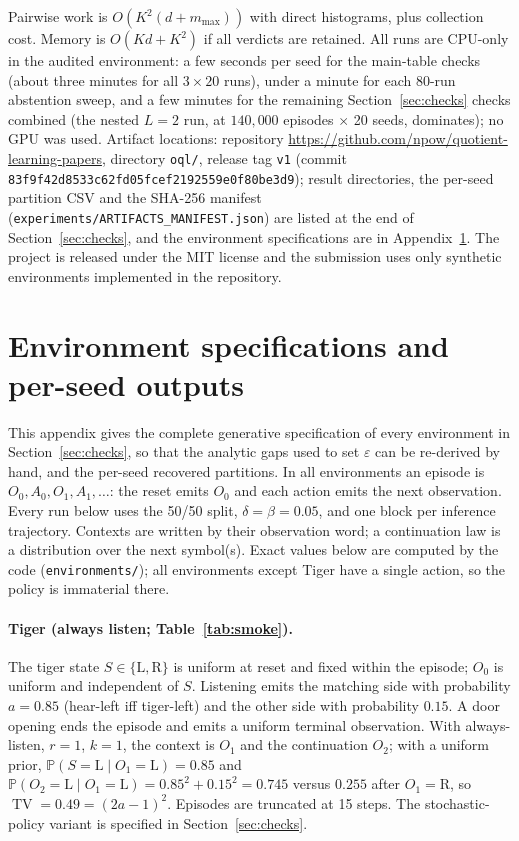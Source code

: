 \documentclass{article}
\newcommand{\Prb}{\mathbb P}
\newcommand{\eps}{\varepsilon}
\DeclareMathOperator{\TV}{TV}
\begin{document}
Pairwise work is $O(K^2(d+m_{\max}))$ with direct histograms, plus collection
cost.  Memory is $O(Kd+K^2)$ if all verdicts are retained.  All runs are
CPU-only in the audited environment: a few seconds per seed for the
main-table checks (about three minutes for all $3\times20$ runs), under
a minute for each 80-run abstention sweep, and a few minutes for the
remaining Section~\ref{sec:checks} checks combined (the nested $L=2$ run,
at $140{,}000$ episodes $\times$ 20 seeds, dominates); no GPU was used.
Artifact locations: repository \url{https://github.com/npow/quotient-learning-papers},
directory \texttt{oql/}, release tag \texttt{v1} (commit \texttt{83f9f42d8533c62fd05fcef2192559e0f80be3d9}); result directories, the
per-seed partition CSV and the SHA-256 manifest
(\texttt{experiments/ARTIFACTS\_MANIFEST.json}) are listed at the end of
Section~\ref{sec:checks}, and the environment specifications are in
Appendix~\ref{app:envs}.  The project is released under the MIT license and the submission uses only
synthetic environments implemented in the repository.

\section{Environment specifications and per-seed outputs}\label{app:envs}

This appendix gives the complete generative specification of every
environment in Section~\ref{sec:checks}, so that the analytic gaps used to set
$\eps$ can be re-derived by hand, and the per-seed recovered partitions.
In all environments an episode is $O_0,A_0,O_1,A_1,\ldots$: the reset emits
$O_0$ and each action emits the next observation.  Every run below uses the
50/50 split, $\delta=\beta=0.05$, and one block per inference trajectory.
Contexts are written by their observation word; a continuation law is a
distribution over the next symbol(s).  Exact values below are computed by
the code (\texttt{environments/}); all environments except Tiger have a single
action, so the policy is immaterial there.

\paragraph{Tiger (always listen; Table~\ref{tab:smoke}).}
The tiger state $S\in\{\text{L},\text{R}\}$ is uniform at reset and fixed
within the episode; $O_0$ is uniform and independent of $S$.  Listening
emits the matching side with probability $a=0.85$ (hear-left iff tiger-left)
and the other side with probability $0.15$.  A door opening ends the episode
and emits a uniform terminal observation.  With always-listen, $r=1$, $k=1$,
the context is $O_1$ and the continuation $O_2$; with a uniform prior,
$\Prb(S{=}\text{L}\mid O_1{=}\text{L})=0.85$ and
$\Prb(O_2{=}\text{L}\mid O_1{=}\text{L})=0.85^2+0.15^2=0.745$ versus
$0.255$ after $O_1=\text{R}$, so $\TV=0.49=(2a-1)^2$.  Episodes are truncated
at 15 steps.  The stochastic-policy variant is specified in
Section~\ref{sec:checks}.
\end{document}
